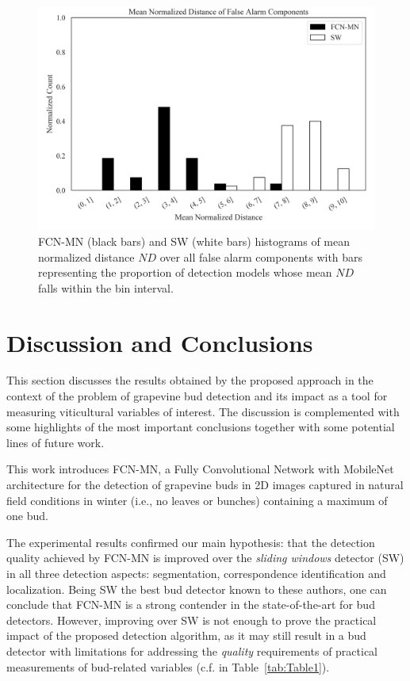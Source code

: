 \documentclass[a4paper,authoryear,review]{elsarticle}
\begin{document}
	\begin{figure}[H]%
		\centering
		\includegraphics[width=\textwidth]{figures/Figure7.png}%
		\caption{
			FCN-MN (black bars) and SW (white bars) histograms of mean normalized distance $ND$ over all false alarm components with bars representing the proportion of detection models whose mean $ND$ falls within the bin interval.
		}
		\label{fig:Figure7}
	\end{figure}
	
	
	\section{Discussion and Conclusions}
	\label{sec:discussion}
	
	This section discusses the results obtained by the proposed approach in the context of the problem of grapevine bud detection and its impact as a tool for measuring viticultural variables of interest. The discussion is complemented with some highlights of the most important conclusions together with some potential lines of future work.
	
	This work introduces FCN-MN, a Fully Convolutional Network with MobileNet architecture for the detection of grapevine buds in 2D images captured in natural field conditions in winter (i.e., no leaves or bunches) containing a maximum of one bud.
	
	The experimental results confirmed our main hypothesis: that the detection quality achieved by FCN-MN is improved over the \emph{sliding windows} detector (SW) in all three detection aspects: segmentation, correspondence identification and localization. Being SW the best bud detector known to these authors, one can conclude that FCN-MN is a strong contender in the state-of-the-art for bud detectors. 
	However, improving over SW is not enough to prove the practical impact of the proposed detection algorithm, as it may still result in a bud detector with limitations for addressing the \emph{quality} requirements of practical measurements of bud-related variables (c.f. in Table~\ref{tab:Table1}). 
	
\end{document}
